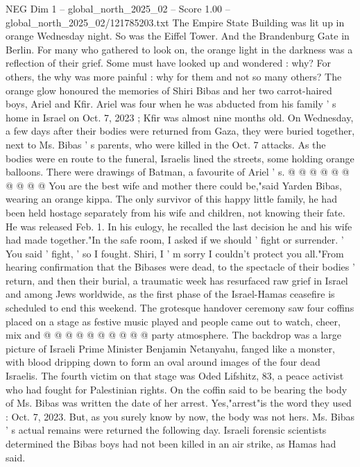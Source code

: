\begin{textsample}{NEG Dim 1 – global\_north\_2025\_02 – Score 1.00 – global\_north\_2025\_02/121785203.txt}  \label{ex:f1_neg_013}
The Empire State Building was lit up in orange Wednesday night.
So was the Eiffel Tower.
And the Brandenburg Gate in Berlin.
For many who gathered to look on, the orange light in the darkness was a reflection of their grief.
Some must have looked up and wondered : why?
For others, the why was more painful : why for them and not so many others?
The orange glow honoured the memories of Shiri Bibas and her two carrot-haired boys, Ariel and Kfir.
Ariel was four when he was abducted from his family ' s home in Israel on Oct. 7, 2023 ; Kfir was almost nine months old.
On Wednesday, a few days after their bodies were returned from Gaza, they were buried together, next to Ms.
Bibas ' s parents, who were killed in the Oct. 7 attacks.
As the bodies were en route to the funeral, Israelis lined the streets, some holding orange balloons.
There were drawings of Batman, a favourite of Ariel ' s. @ @ @ @ @ @ @ @ @ @ You are the best wife and mother there could be,"said Yarden Bibas, wearing an orange kippa.
The only survivor of this happy little family, he had been held hostage separately from his wife and children, not knowing their fate.
He was released Feb. 1.
In his eulogy, he recalled the last decision he and his wife had made together."In the safe room, I asked if we should ' fight or surrender. ' You said ' fight, ' so I fought.
Shiri, I ' m sorry I couldn't protect you all."From hearing confirmation that the Bibases were dead, to the spectacle of their bodies ' return, and then their burial, a traumatic week has resurfaced raw grief in Israel and among Jews worldwide, as the first phase of the Israel-Hamas ceasefire is scheduled to end this weekend.
The grotesque handover ceremony saw four coffins placed on a stage as festive music played and people came out to watch, cheer, mix and @ @ @ @ @ @ @ @ @ @ party atmosphere.
The backdrop was a large picture of Israeli Prime Minister Benjamin Netanyahu, fanged like a monster, with blood dripping down to form an oval around images of the four dead Israelis.
The fourth victim on that stage was Oded Lifshitz, 83, a peace activist who had fought for Palestinian rights.
On the coffin said to be bearing the body of Ms.
Bibas was written the date of her arrest.
Yes,"arrest"is the word they used : Oct. 7, 2023.
But, as you surely know by now, the body was not hers.
Ms.
Bibas ' s actual remains were returned the following day.
Israeli forensic scientists determined the Bibas boys had not been killed in an air strike, as Hamas had said.

\end{textsample}
